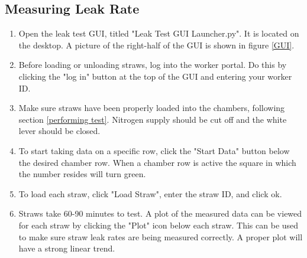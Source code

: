 \documentclass[A4,12pt]{article}
\begin{document}
\subsection{Measuring Leak Rate}
	\begin{enumerate}
    	\item Open the leak test GUI, titled "Leak Test GUI Launcher.py".  It is located on the desktop.  A picture of the right-half of the GUI is shown in figure \ref{GUI}.
        \item Before loading or unloading straws, log into the worker portal.  Do this by clicking the "log in" button at the top of the GUI and entering your worker ID.
        \item Make sure straws have been properly loaded into the chambers, following section \ref{performing test}.  Nitrogen supply should be cut off and the white lever should be closed.
        \item To start taking data on a specific row, click the "Start Data" button below the desired chamber row.  When a chamber row is active the square in which the number resides will turn green.
        \item To load each straw, click "Load Straw", enter the straw ID, and click ok.
        \item Straws take 60-90 minutes to test.  A plot of the measured data can be viewed for each straw by clicking the "Plot" icon below each straw.  This can be used to make sure straw leak rates are being measured correctly.  A proper plot will have a strong linear trend.
        \end{enumerate}
\end{document}
